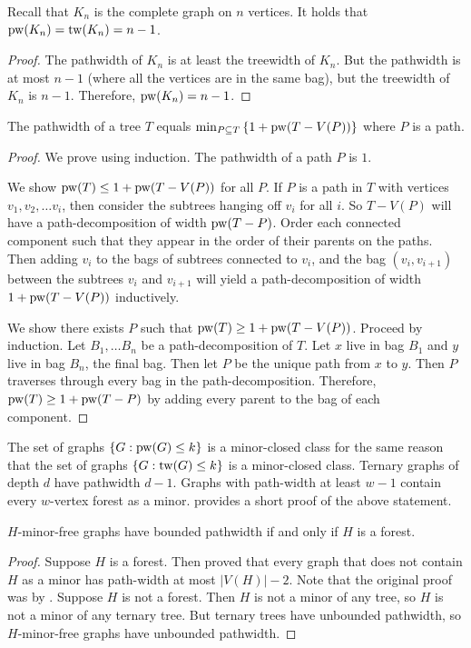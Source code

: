 \begin{example}
	Recall that $K_n$ is the complete graph on $n$ vertices. It holds that \(\operatorname{pw}(K_n) = \operatorname{tw}(K_n) = n - 1\).
\end{example}
\begin{proof}
	The pathwidth of \(K_n\) is at least the treewidth of \(K_n\). But the pathwidth is at most \(n- 1\) (where all the vertices are in the same bag), but the treewidth of \(K_n\) is \(n - 1\). Therefore, \(\operatorname{pw}(K_n) = n - 1\).
\end{proof}

\begin{proposition}
	The pathwidth of a tree \(T\) equals \(\min_{P \subseteq T} \left\lbrace 1 + \operatorname{pw}(T - V(P))\right\rbrace \) where \(P\) is a path.
\end{proposition}

\begin{proof}[Proof]
	We prove using induction. The pathwidth of a path $P$ is $1$.

	We show \(\operatorname{pw}(T) \leq 1 + \operatorname{pw}(T - V(P))\) for all $P$. If \(P\) is a path in \(T\) with vertices \(v_1, v_2, \ldots v_i\), then consider the subtrees hanging off \(v_i\) for all \(i\). So \(T - V(P)\) will have a path-decomposition of width $\operatorname{pw}(T - P)$. Order each connected component such that they appear in the order of their parents on the paths. Then adding \(v_i\) to the bags of subtrees connected to \(v_i\), and the bag \((v_i, v_{i+1})\) between the subtrees \(v_i\) and \(v_{i + 1}\) will yield a path-decomposition of width \(1 + \operatorname{pw}(T - V(P))\) inductively.

	We show there exists $P$ such that \(\operatorname{pw}(T) \geq 1 + \operatorname{pw}(T - V(P))\). Proceed by induction. Let \(B_1, \ldots B_n\) be a path-decomposition of \(T\). Let \(x\) live in bag \(B_1\) and \(y\) live in bag \(B_n\), the final bag. Then let \(P\) be the unique path from \(x\) to \(y\). Then \(P\) traverses through every bag in the path-decomposition. Therefore, \(\operatorname{pw}(T) \geq 1 + \operatorname{pw}(T - P)\) by adding every parent to the bag of each component. 
\end{proof}

The set of graphs $\{G : \operatorname{pw}(G) \leq k\}$ is a minor-closed class for the same reason that the set of graphs $\{G : \operatorname{tw}(G) \leq k\}$ is a minor-closed class.
Ternary graphs of depth $d$ have pathwidth $d-1$. Graphs with path-width at least $w - 1$ contain every $w$-vertex forest as a minor. \textcite{seymourShorterProofPathwidth2023} provides a short proof of the above statement. 
\begin{theorem}
	$H$-minor-free graphs have bounded pathwidth if and only if $H$ is a forest. 
\end{theorem}

\begin{proof}
	Suppose $H$ is a forest. Then \textcite{seymourShorterProofPathwidth2023} proved that every graph that does not contain $H$ as a minor has path-width at most $|V(H)| - 2$. Note that the original proof was by \textcite{robertsonGraphMinorsExcluding1983}. 
	Suppose $H$ is not a forest. Then $H$ is not a minor of any tree, so $H$ is not a minor of any ternary tree. But ternary trees have unbounded pathwidth, so $H$-minor-free graphs have unbounded pathwidth.
\end{proof}
